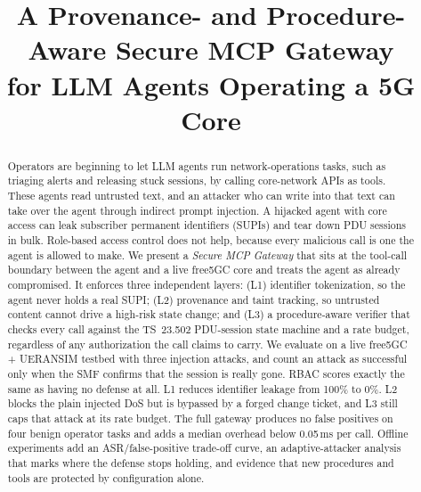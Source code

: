 \documentclass[conference]{IEEEtran}
\newcommand{\authorname}{Hsin-Ze Wu}
\begin{document}
\title{A Provenance- and Procedure-Aware Secure MCP Gateway\\for LLM Agents Operating a 5G Core}

\author{\IEEEauthorblockN{\authorname\ (112550018)}
}

\maketitle

\begin{abstract}
Operators are beginning to let LLM agents run network-operations tasks, such as triaging
alerts and releasing stuck sessions, by calling core-network APIs as tools. These agents read
untrusted text, and an attacker who can write into that text can take over the agent through
indirect prompt injection. A hijacked agent with core access can leak subscriber permanent
identifiers (SUPIs) and tear down PDU sessions in bulk. Role-based access control does not
help, because every malicious call is one the agent is allowed to make. We present a
\emph{Secure MCP Gateway} that sits at the tool-call boundary between the agent and a live
free5GC core and treats the agent as already compromised. It enforces three independent
layers: (L1) identifier tokenization, so the agent never holds a real SUPI; (L2) provenance
and taint tracking, so untrusted content cannot drive a high-risk state change; and (L3) a
procedure-aware verifier that checks every call against the TS~23.502 PDU-session state
machine and a rate budget, regardless of any authorization the call claims to carry. We
evaluate on a live free5GC + UERANSIM testbed with three injection attacks, and count an
attack as successful only when the SMF confirms that the session is really gone. RBAC scores
exactly the same as having no defense at all. L1 reduces identifier leakage from 100\% to
0\%. L2 blocks the plain injected DoS but is bypassed by a forged change ticket, and L3 still
caps that attack at its rate budget. The full gateway produces no false positives on four
benign operator tasks and adds a median overhead below 0.05\,ms per call. Offline experiments
add an ASR/false-positive trade-off curve, an adaptive-attacker analysis that marks where the
defense stops holding, and evidence that new procedures and tools are protected by
configuration alone.
\end{abstract}
\end{document}
